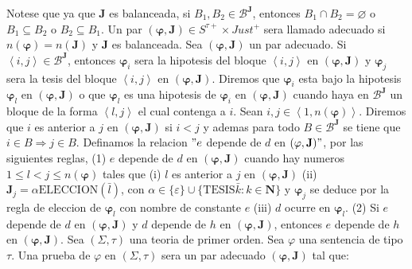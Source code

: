 Notese que ya que \(\mathbf{J}\) es balanceada, si \(B_{1},B_{2}\in \mathcal{B} ^{\mathbf{J}}\), entonces \(B_{1}\cap B_{2}=\varnothing \) o \(B_{1}\subseteq B_{2} \) o \(B_{2}\subseteq B_{1}\). Un par \((\mathbf{\varphi },\mathbf{J})\in S^{\tau +}\times Just^{+}\) sera llamado adecuado si \(n(\mathbf{ \varphi })=n(\mathbf{J})\) y \(\mathbf{J}\) es balanceada. Sea \((\mathbf{ \varphi },\mathbf{J})\) un par adecuado. Si \(\left\langle i,j\right\rangle \in \mathcal{B}^{\mathbf{J}}\), entonces \(\mathbf{\varphi }_{i}\) sera la hipotesis del bloque \(\left\langle i,j\right\rangle \) en \((\mathbf{ \varphi },\mathbf{J})\) y \(\mathbf{\varphi }_{j}\) sera la tesis del bloque \(\left\langle i,j\right\rangle \) en \((\mathbf{\varphi },\mathbf{J})\). Diremos que \(\mathbf{\varphi }_{i}\) esta bajo la hipotesis \(\mathbf{ \varphi }_{l}\) en \((\mathbf{\varphi },\mathbf{J})\) o que \(\mathbf{ \varphi }_{l}\) es una hipotesis de \(\mathbf{\varphi }_{i}\) en \((\mathbf{\varphi },\mathbf{J})\) cuando haya en \(\mathcal{B}^{\mathbf{J} } \) un bloque de la forma \(\left\langle l,j\right\rangle \) el cual contenga a \(i\). Sean \(i,j\in \left\langle 1,n(\mathbf{\varphi })\right\rangle .\) Diremos que \(i\) es anterior a \(j\) en \((\mathbf{\varphi }, \mathbf{J})\) si \(i< j\) y ademas para todo \(B\in \mathcal{B}^{\mathbf{J}}\) se tiene que \(i\in B\Rightarrow j\in B\). Definamos la relacion \("e\) depende de \(d\) en \((\mathbf{\varphi },\mathbf{J})"\), por las siguientes reglas,
(1) \(e\) depende de \(d\) en \((\mathbf{\varphi }, \mathbf{J})\) cuando hay numeros \(1\leq l< j\leq n(\mathbf{\varphi })\) tales que
(i) \(l\) es anterior a \(j\) en \((\mathbf{\varphi },\mathbf{J})\)
(ii) \(\mathbf{J}_{j}=\alpha \mathrm{ELECCION}(\bar{l})\), con \(\alpha \in \{\varepsilon \}\cup \{\mathrm{TESIS}\bar{k}:k\in \mathbf{N}\}\) y \( \mathbf{\varphi }_{j}\) se deduce por la regla de eleccion de \(\mathbf{ \varphi }_{l}\) con nombre de constante \(e\)
(iii) \(d\) ocurre en \(\mathbf{\varphi }_{l}\).
(2) Si \(e\) depende de \(d\) en \((\mathbf{\varphi },\mathbf{J} ) \) y \(d\) depende de \(h\) en \((\mathbf{\varphi },\mathbf{J})\), entonces \(e\) depende de \(h\) en \((\mathbf{\varphi },\mathbf{ J}).\)
Sea \((\Sigma ,\tau )\) una teoria de primer orden. Sea \(\varphi \) una sentencia de tipo \(\tau \). Una prueba de \(\varphi \) en \((\Sigma ,\tau )\) sera un par adecuado \((\mathbf{\varphi },\mathbf{J})\) tal que:


